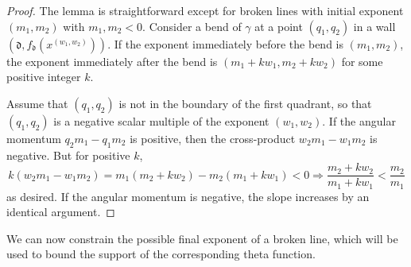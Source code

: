 \documentclass[11pt]{amsart}
\theoremstyle{remark}
\numberwithin{equation}{section}
\newcommand{\fd}{\mathfrak{d}}
\begin{document}
\begin{proof}
The lemma is straightforward except for broken lines with initial exponent $(m_1,m_2)$ with $m_1,m_2<0$.
Consider a bend of $\gamma$ at a point $(q_1,q_2)$ in a wall $(\fd,f_{\fd}(x^{(w_1,w_2)}))$.  If the exponent immediately before the bend is $(m_1,m_2)$, the exponent immediately after the bend is $(m_1+kw_1,m_2+kw_2)$ for some positive integer $k$.  

Assume that $(q_1,q_2)$ is not in the boundary of the first quadrant, so that $(q_1,q_2)$ is a negative scalar multiple of the exponent $(w_1,w_2)$. If the angular momentum $q_2m_1-q_1m_2$ is positive, then the cross-product $w_2m_1-w_1m_2$ is negative.  But for positive $k$,
\[ k(w_2m_1-w_1m_2) =m_1(m_2+kw_2)-m_2(m_1+kw_1)<0 \Rightarrow \frac{m_2+kw_2}{m_1+kw_1} < \frac{m_2}{m_1}\]
as desired.  If the angular momentum is negative, the slope increases by an identical argument.
\end{proof}

We can now constrain the possible final exponent of a broken line, which will be used to bound the support of the corresponding theta function.
\end{document}
